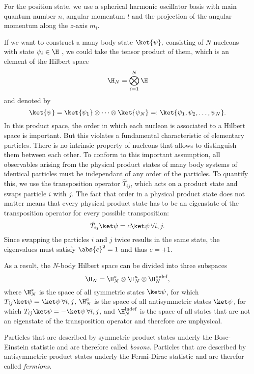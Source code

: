 For the position state, we use a spherical harmonic oscillator basis with main quantum number $n$, angular momentum $l$ and the projection of the angular momentum along the $z$-axis $m_l$.

If we want to construct a many body state $\ket{\psi}$, consisting of $N$ nucleons with state $\psi_i \in \H$ , we could take the tensor product of them, which is an element of the Hilbert space
\begin{equation}
  \H_N = \bigotimes_{i=1}^{N} \H
\end{equation}
and denoted by
\begin{equation}
  \ket{\psi} = \ket{\psi_1} \otimes \dots \otimes \ket{\psi_N} =: \ket{\psi_1, \psi_2, \dots, \psi_N}.
\end{equation}
In this product space, the order in which each nucleon is associated to a Hilbert space is important. But this violates a fundamental characteristic of elementary particles. There is no intrinsic property of nucleons that allows to distinguish them between each other. To conform to this important assumption, all observables arising from the physical product states of many body systems of identical particles must be independant of any order of the particles. To quantify this, we use the transposition operator $\hat{T}_{ij}$, which acts on a product state and swaps particle $i$ with $j$. The fact that order in a physical product state does not matter means that every physical product state has to be an eigenstate of the transposition operator for every possible transposition:
\begin{equation}
  \hat{T}_{ij}\ket\psi = c\ket\psi \, \forall i,j.
\end{equation}
Since swapping the particles $i$ and $j$ twice results in the same state, the eigenvalues must satisfy $\abs{c}^2 = 1$ and thus $c = \pm 1$.

As a result, the $N$-body Hilbert space can be divided into three subspaces
\begin{equation}
  \H_N = \H_N^s \otimes \H_N^a \otimes \H_N^{\mathrm{indef}},
\end{equation}
where $\H_N^s$ is the space of all symmetric states $\ket\psi$, for which $T_{ij}\ket\psi = \ket\psi\, \forall i,j$, $\H_N^a$ is the space of all antisymmetric states $\ket\psi$, for which $T_{ij}\ket\psi = -\ket\psi\, \forall i,j$, and $\H_N^{\mathrm{indef}}$ is the space of all states that are not an eigenstate of the transposition operator and therefore are unphysical.

Particles that are described by symmetric product states underly the Bose-Einstein statistic and are therefore called \textit{bosons}. Particles that are described by antisymmetric product states underly the Fermi-Dirac statistic and are therefor called \textit{fermions}.

